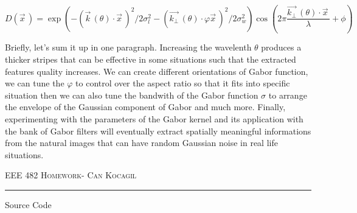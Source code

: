 \documentclass[12pt]{amsart}
\makeatletter
\def\section{\@startsection{section}{1}%
  \z@{.7\linespacing\@plus\linespacing}{.5\linespacing}%
  {\normalfont\scshape}}%
\makeatother
\begin{document}
\begin{equation}
    D(\vec{x}^{\,}) = \exp{\left( - (\vec{k}^{\,}(\theta) \cdot \vec{x}^{\,})^2 / 2\sigma_l^2 - (\vec{k_\bot}^{\,}(\theta) \cdot \varphi\vec{x}^{\,})^2 / 2\sigma_w^2 \right)} \cos{\left(2\pi \frac{\vec{k_\bot}^{\,}(\theta) \cdot \vec{x}^{\,}}{\lambda} + \phi \right)}
\end{equation}


Briefly, let's sum it up in one paragraph. Increasing the wavelenth $\theta$ produces a thicker stripes that can be effective in some situations such that the extracted features quality increases. We can create different orientations of Gabor function, we can tune the $\varphi$ to control over the aspect ratio so that it fits into specific situation then we can also tune the bandwith of the Gabor function $\sigma$ to arrange the envelope of the Gaussian component of Gabor and much more. Finally, experimenting with the parameters of the Gabor kernel and its application with the bank of Gabor filters will eventually extract spatially meaningful informations from the natural images that can have random Gaussian noise in real life situations.




\newpage
{\scshape EEE 482} \hfill {\scshape \large  Homework-\relax} \hfill {\scshape Can Kocagil}
\smallskip
\hrule
\vspace{2mm}



\section{Source Code}
\end{document}
